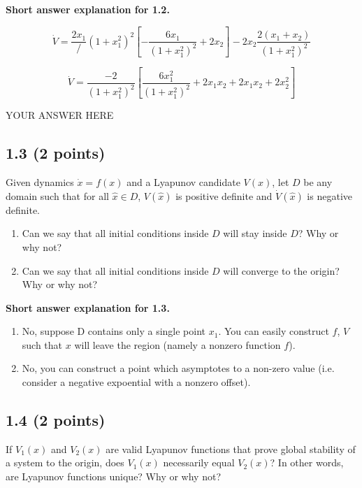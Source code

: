 \documentclass[11pt]{article}
\begin{document}
    \textbf{Short answer explanation for 1.2.}

\[\dot{V} = \frac{2 x_1}/{(1 + x_1^2)^2}\left[-\frac{6x_1}{(1+x_1^2)^2}+2x_2 \right]   - 2 x_2 \frac{2(x_1+x_2)}{(1+x_1^2)^2}\]

\[\dot{V} = \frac{-2}{(1 + x_1^2)^2} \left[ \frac{6x_1^2}{(1+x_1^2)^2}+2x_1 x_2 + 2 x_1 x_2 + 2x_2^2 \right]\]

YOUR ANSWER HERE

    \subsection{1.3 (2 points)}\label{points}

Given dynamics \(\dot{x} = f(x)\) and a Lyapunov candidate \(V(x)\), let
\(D\) be any domain such that for all \(\hat{x} \in D\), \(V(\hat{x})\)
is positive definite and \(\dot{V}(\hat{x})\) is negative definite.

\begin{enumerate}
\def\labelenumi{\arabic{enumi})}
\item
  Can we say that all initial conditions inside \(D\) will stay inside
  \(D\)? Why or why not?
\item
  Can we say that all initial conditions inside \(D\) will converge to
  the origin? Why or why not?
\end{enumerate}

    \textbf{Short answer explanation for 1.3.}

\begin{enumerate}
\def\labelenumi{\arabic{enumi})}
\item
  No, suppose D contains only a single point \(x_1\). You can easily
  construct \(f\), \(V\) such that \(x\) will leave the region (namely a
  nonzero function \(f\)).
\item
  No, you can construct a point which asymptotes to a non-zero value
  (i.e. consider a negative expoential with a nonzero offset).
\end{enumerate}

    \subsection{1.4 (2 points)}\label{points}

If \(V_1(x)\) and \(V_2(x)\) are valid Lyapunov functions that prove
global stability of a system to the origin, does \(V_1(x)\) necessarily
equal \(V_2(x)\)? In other words, are Lyapunov functions unique? Why or
why not?
\end{document}
